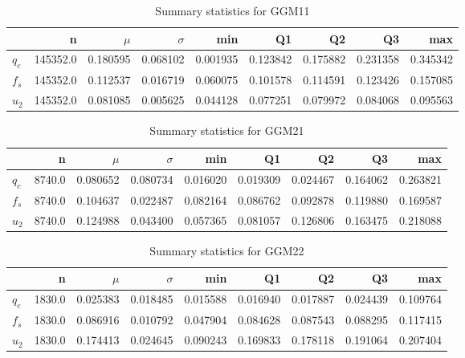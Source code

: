 \begin{table}[h]
\caption{Summary statistics for GGM11}
\begin{tabular}{lrrrrrrrr}
\toprule
{} &         n &     $\mu$ &  $\sigma$ &       min &        Q1 &        Q2 &        Q3 &       max \\
\midrule
$q_c$ &  145352.0 &  0.180595 &  0.068102 &  0.001935 &  0.123842 &  0.175882 &  0.231358 &  0.345342 \\
$f_s$ &  145352.0 &  0.112537 &  0.016719 &  0.060075 &  0.101578 &  0.114591 &  0.123426 &  0.157085 \\
$u_2$ &  145352.0 &  0.081085 &  0.005625 &  0.044128 &  0.077251 &  0.079972 &  0.084068 &  0.095563 \\
\bottomrule
\end{tabular}
\end{table}

\begin{table}[h]
\caption{Summary statistics for GGM21}
\begin{tabular}{lrrrrrrrr}
\toprule
{} &       n &     $\mu$ &  $\sigma$ &       min &        Q1 &        Q2 &        Q3 &       max \\
\midrule
$q_c$ &  8740.0 &  0.080652 &  0.080734 &  0.016020 &  0.019309 &  0.024467 &  0.164062 &  0.263821 \\
$f_s$ &  8740.0 &  0.104637 &  0.022487 &  0.082164 &  0.086762 &  0.092878 &  0.119880 &  0.169587 \\
$u_2$ &  8740.0 &  0.124988 &  0.043400 &  0.057365 &  0.081057 &  0.126806 &  0.163475 &  0.218088 \\
\bottomrule
\end{tabular}
\end{table}

\begin{table}[h]
\caption{Summary statistics for GGM22}
\begin{tabular}{lrrrrrrrr}
\toprule
{} &       n &     $\mu$ &  $\sigma$ &       min &        Q1 &        Q2 &        Q3 &       max \\
\midrule
$q_c$ &  1830.0 &  0.025383 &  0.018485 &  0.015588 &  0.016940 &  0.017887 &  0.024439 &  0.109764 \\
$f_s$ &  1830.0 &  0.086916 &  0.010792 &  0.047904 &  0.084628 &  0.087543 &  0.088295 &  0.117415 \\
$u_2$ &  1830.0 &  0.174413 &  0.024645 &  0.090243 &  0.169833 &  0.178118 &  0.191064 &  0.207404 \\
\bottomrule
\end{tabular}
\end{table}

